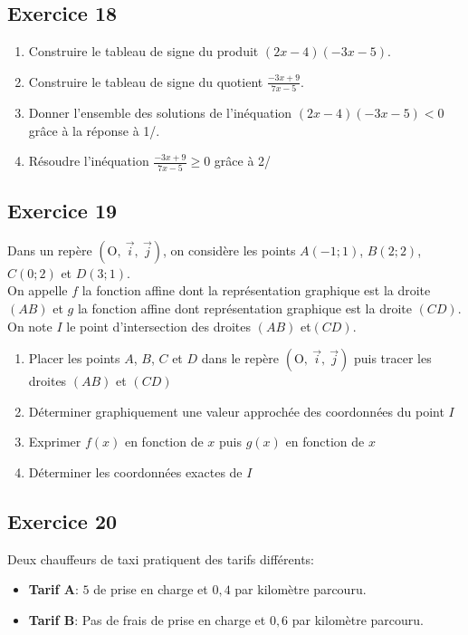 \documentclass[12pt,a4paper]{article}
\def\Oij{$\left(\text{O},~\vec{i},~\vec{j}\right)$}
\begin{document}
\subsection*{Exercice 18}
\begin{enumerate}
\item Construire le tableau de signe du produit $(2x-4)(-3x-5)$.\medskip
\item Construire le tableau de signe du quotient $\frac{-3x+9}{7x-5}$.\medskip
\item Donner l'ensemble des solutions de l'inéquation $(2x-4)(-3x-5)<0$ grâce à la réponse à 1/.\medskip
\item Résoudre l'inéquation $\frac{-3x+9}{7x-5}\geqslant0$ grâce à 2/
\end{enumerate}



\subsection*{Exercice 19}

Dans un repère \Oij{}, on considère les points $A(-1;1)$, $B(2;2)$, $C(0;2)$ et $D(3;1)$.\\
On appelle $f$ la fonction affine dont la représentation graphique est la droite $(AB)$ et $g$ la fonction affine dont représentation graphique est la droite $(CD)$. On note $I$ le point d'intersection des droites $(AB)$ et$(CD)$.

\begin{enumerate}
    \item Placer les points $A$, $B$, $C$ et $D$ dans le repère \Oij{} puis tracer les droites $(AB)$ et $(CD)$
    \item Déterminer graphiquement une valeur approchée des coordonnées du point $I$
    \item Exprimer $f(x)$ en fonction de $x$ puis $g(x)$ en fonction de $x$
    \item Déterminer les coordonnées exactes de $I$
\end{enumerate}
\newpage
\subsection*{Exercice 20}

Deux chauffeurs de taxi pratiquent des tarifs  différents:

\begin{itemize}
    \item \textbf{Tarif A}: $5$ \EUR{} de prise en charge et $0,4$ \EUR{} par kilomètre parcouru.
    \item  \textbf{Tarif B}: Pas de frais de prise en charge et $0,6$ \EUR{} par kilomètre parcouru.
\end{itemize}
\end{document}
